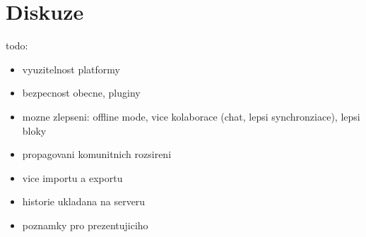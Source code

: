\chapter{Diskuze}\label{text:diskuze}

todo\todo:

\begin{itemize}
    \item vyuzitelnost platformy
    \item bezpecnost obecne, pluginy
    \item mozne zlepseni: offline mode, vice kolaborace (chat, lepsi synchronziace), lepsi bloky
    \item propagovani komunitnich rozsireni
    \item vice importu a exportu
    \item historie ukladana na serveru
    \item poznamky pro prezentujiciho
\end{itemize}